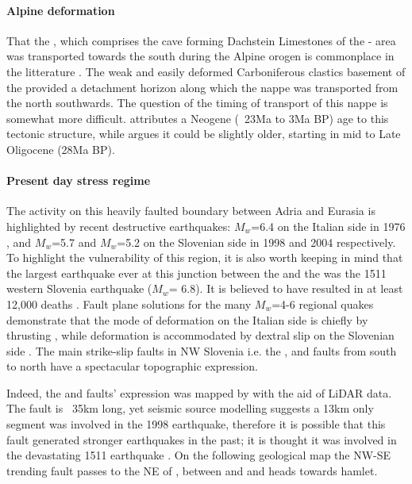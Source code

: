 \paragraph{Alpine deformation}
\label{par:alpine deformation}
That the , which comprises the cave forming Dachstein Limestones of the - area was transported towards the south during the Alpine orogen is commonplace in the litterature \citep{doglioni1987eoalpine,placer1998contribution}. 
The weak and easily deformed Carboniferous clastics basement of the  provided a detachment horizon along which the nappe was transported from the north southwards. The question of the timing of transport of this nappe is somewhat more difficult. \citet{buser1986tolmavc} attributes a Neogene (~23Ma to 3Ma BP) age to this tectonic structure, while \citet{placer1998contribution} argues it could be slightly older, starting in mid to Late Oligocene (28Ma BP).

\paragraph{Present day stress regime}
\label{par:present day stress regime}
The activity on this heavily faulted boundary between Adria and Eurasia is highlighted by recent destructive earthquakes: $M_w$=6.4 on the Italian side in 1976 \citep{pondrelli2001seismotectonic}, and $M_w$=5.7 and $M_w$=5.2 on the Slovenian side in 1998 \citep{bajc20011998} and 2004 \citep{aoudia2005july} respectively. 
To highlight the vulnerability of this region, it is also worth keeping in mind that the largest earthquake ever at this junction between the  and the  was the 1511 western Slovenia earthquake ($M_w$= 6.8). It is believed to have resulted in at least 12,000 deaths \citep{fitzko2005constraints}.
Fault plane solutions for the many $M_w$=4-6 regional quakes demonstrate that the mode of deformation on the Italian side is chiefly by thrusting \citep{poli2002new}, while deformation is accommodated by dextral slip on the Slovenian side \citep{poljak2000seismotectonic}. 
The main strike-slip faults in NW Slovenia i.e. the ,  and  faults from south to north have a spectacular topographic expression. 

Indeed, the  and  faults' expression was mapped by \citet{cunningham2006application} with the aid of LiDAR data. The  fault is ~35km long, yet seismic source modelling suggests a 13km only segment was involved in the 1998 earthquake, therefore it is possible that this fault generated stronger earthquakes in the past; it is thought it was involved in the devastating 1511 earthquake \citet{fitzko2005constraints}.
On the following geological map  the NW-SE trending fault passes to the NE of , between  and  and heads towards  hamlet.

